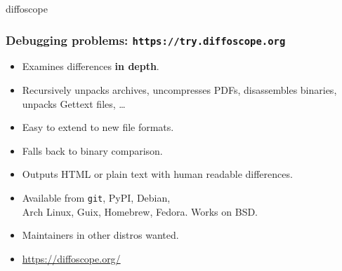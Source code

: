 \documentclass[14pt]{beamer}
\begin{document}
{

\begin{frame}{diffoscope}
 \frametitle{Debugging problems: \texttt{https://try.diffoscope.org}}

 \begin{itemize}
  \item Examines differences \textbf{in depth}.
  \item Recursively unpacks archives, uncompresses PDFs, disassembles
  binaries, unpacks Gettext files, …
  \item Easy to extend to new file formats.
  \item Falls back to binary comparison.
  \item Outputs HTML or plain text with human readable differences.
  \item Available from \texttt{git}, PyPI, Debian, \\
   Arch Linux, Guix, Homebrew, Fedora. Works on BSD.
  \item Maintainers in other distros wanted.
  \item \url{https://diffoscope.org/}
 \end{itemize}
\end{frame}


}
\end{document}
